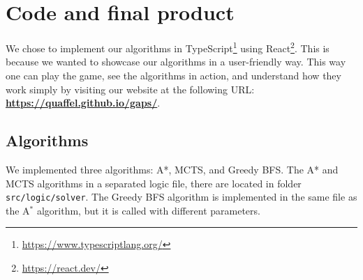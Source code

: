 \chapter{Code and final product}
We chose to implement our algorithms in TypeScript\footnote{\url{https://www.typescriptlang.org/}} using React\footnote{\url{https://react.dev/}}. This is because we wanted to showcase our algorithms in a user-friendly way. This way one can play the game, see the algorithms in action, and understand how they work simply by visiting our website at the following URL: \textbf{\url{https://quaffel.github.io/gaps/}}.

\section{Algorithms}
We implemented three algorithms: A*, MCTS, and Greedy BFS. The A* and MCTS algorithms in a separated logic file, there are located in folder \texttt{src/logic/solver}. The Greedy BFS algorithm is implemented in the same file as the A$^*$ algorithm, but it is called with different parameters.




